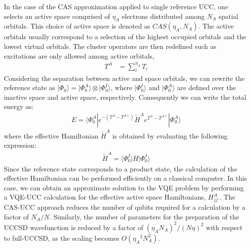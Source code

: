 \documentclass[superscriptaddress,aps,pra,twocolumn,nofootinbib,babel]{revtex4-1}
\begin{document}
In the case of the CAS approximation applied to single reference UCC, one selects an active space comprised of $\eta_{A}$ electrons distributed among $N_A$ spatial orbitals. This choice of active space is denoted as $CAS(\eta_{A}, N_A)$. The active orbitals usually correspond to a selection of the highest occupied orbitals and the lowest virtual orbitals. The cluster operators are then redefined such as excitations are only allowed among active orbitals,
\begin{align}\label{cas:T}
T^A&=\sum^{\eta_A}_{i} T_i
\end{align}
Considering the separation between active and space orbitals, we can rewrite the reference state as $|\Phi_{0}\rangle= |\Phi^{A}_{0}\rangle \otimes |\Phi^{I}_{0}\rangle$, where $|\Phi^{I}_{0}\rangle$ and $|\Phi^{A}_{0}\rangle$ are defined over the inactive space and active space, respectively. Consequently we can write the total energy as:
\begin{align}
\label{effectiveUCCenergy}
E= \langle \Phi^{A}_{0}| e^{-(T^{A}-T^{A \dagger})} \tilde{H}^{A} e^{T^{A}-T^{A\dagger}}  |\Phi^{A}_{0}\rangle
\end{align}
where the effective Hamiltonian $\tilde{H}^{A}$ is obtained by evaluating the following expression:
\begin{align}\label{effectiveH}
\tilde{H}^{A}= \langle \Phi^{I}_{0}|H|\Phi^{I}_{0}\rangle
\end{align}
Since the reference state corresponds to a product state, the calculation of the effective Hamiltonian can be performed efficiently on a classical computer. In this case, we can obtain an approximate solution to the VQE problem by performing a VQE-UCC calculation for the effective active space Hamiltonians, $H_{jj'}^{A}$. The CAS-UCC approach reduces the number of qubits required for a calculation by a factor of $N_A/N$. Similarly, the number of parameters for the preparation of the UCCSD wavefunction is reduced by a factor of $(\eta_A N_A)^2/(N\eta)^2$ with respect to full-UCCSD, as the scaling becomes $O({\eta_{A}}^2 N_{A}^2)$.
\end{document}
